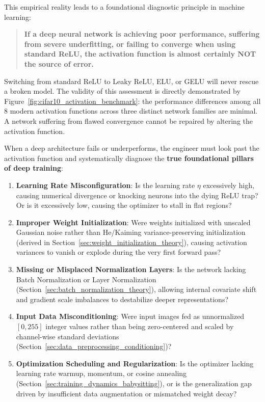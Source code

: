 This empirical reality leads to a foundational diagnostic principle in machine learning:
\begin{quote}
\textbf{If a deep neural network is achieving poor performance, suffering from severe underfitting, or failing to converge when using standard ReLU, the activation function is almost certainly NOT the source of error.}
\end{quote}
Switching from standard ReLU to Leaky ReLU, ELU, or GELU will never rescue a broken model. The validity of this assessment is directly demonstrated by Figure~\ref{fig:cifar10_activation_benchmark}: the performance differences among all 8 modern activation functions across three distinct network families are minimal. A network suffering from flawed convergence cannot be repaired by altering the activation function.

When a deep architecture fails or underperforms, the engineer must look past the activation function and systematically diagnose the \textbf{true foundational pillars of deep training}:
\begin{enumerate}[leftmargin=*]
  \item \textbf{Learning Rate Misconfiguration}: Is the learning rate $\eta$ excessively high, causing numerical divergence or knocking neurons into the dying ReLU trap? Or is it excessively low, causing the optimizer to stall in flat regions?
  \item \textbf{Improper Weight Initialization}: Were weights initialized with unscaled Gaussian noise rather than He/Kaiming variance-preserving initialization (derived in Section~\ref{sec:weight_initialization_theory}), causing activation variances to vanish or explode during the very first forward pass?
  \item \textbf{Missing or Misplaced Normalization Layers}: Is the network lacking Batch Normalization or Layer Normalization (Section~\ref{sec:batch_normalization_theory}), allowing internal covariate shift and gradient scale imbalances to destabilize deeper representations?
  \item \textbf{Input Data Misconditioning}: Were input images fed as unnormalized $[0, 255]$ integer values rather than being zero-centered and scaled by channel-wise standard deviations (Section~\ref{sec:data_preprocessing_conditioning})?
  \item \textbf{Optimization Scheduling and Regularization}: Is the optimizer lacking learning rate warmup, momentum, or cosine annealing (Section~\ref{sec:training_dynamics_babysitting}), or is the generalization gap driven by insufficient data augmentation or mismatched weight decay?
\end{enumerate}


